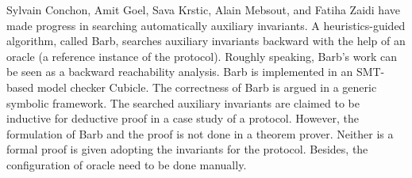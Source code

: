 \documentclass[final]{IEEEtran}
\begin{document}
Sylvain Conchon, Amit Goel, Sava Krstic, Alain Mebsout, and Fatiha Zaidi have made progress in searching automatically auxiliary invariants\cite{Conchon2013}. A heuristics-guided algorithm, called Barb, searches auxiliary invariants backward  with the help of an oracle (a reference instance of the protocol). Roughly speaking, Barb's work can be seen as a backward reachability analysis. Barb is implemented in an SMT-based model checker Cubicle\cite{Conchon2012}. The correctness of Barb is argued in a generic symbolic framework. The searched auxiliary invariants are claimed to be inductive for deductive proof in a case study of a  protocol. However, the formulation of Barb and the proof is not done in a theorem prover. Neither is a formal proof is given adopting the invariants for the protocol. Besides, the configuration of oracle need to be done manually.
\end{document}
